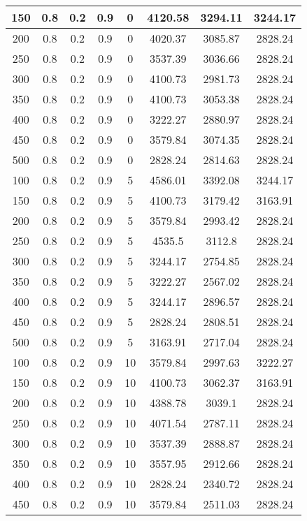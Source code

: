 \documentclass[a4paper, 12pt]{extreport}
\begin{document}
\begin{itemize}
\begin{longtable}{|c|c|c|c|c|c|c|c|}
			150 & 0.8 & 0.2 & 0.9 & 0 & 4120.58 & 3294.11 & 3244.17 \\\hline
			200 & 0.8 & 0.2 & 0.9 & 0 & 4020.37 & 3085.87 & 2828.24 \\\hline
			250 & 0.8 & 0.2 & 0.9 & 0 & 3537.39 & 3036.66 & 2828.24 \\\hline
			300 & 0.8 & 0.2 & 0.9 & 0 & 4100.73 & 2981.73 & 2828.24 \\\hline
			350 & 0.8 & 0.2 & 0.9 & 0 & 4100.73 & 3053.38 & 2828.24 \\\hline
			400 & 0.8 & 0.2 & 0.9 & 0 & 3222.27 & 2880.97 & 2828.24 \\\hline
			450 & 0.8 & 0.2 & 0.9 & 0 & 3579.84 & 3074.35 & 2828.24 \\\hline
			500 & 0.8 & 0.2 & 0.9 & 0 & 2828.24 & 2814.63 & 2828.24 \\\hline
			100 & 0.8 & 0.2 & 0.9 & 5 & 4586.01 & 3392.08 & 3244.17 \\\hline
			150 & 0.8 & 0.2 & 0.9 & 5 & 4100.73 & 3179.42 & 3163.91 \\\hline
			200 & 0.8 & 0.2 & 0.9 & 5 & 3579.84 & 2993.42 & 2828.24 \\\hline
			250 & 0.8 & 0.2 & 0.9 & 5 & 4535.5 & 3112.8 & 2828.24 \\\hline
			300 & 0.8 & 0.2 & 0.9 & 5 & 3244.17 & 2754.85 & 2828.24 \\\hline
			350 & 0.8 & 0.2 & 0.9 & 5 & 3222.27 & 2567.02 & 2828.24 \\\hline
			400 & 0.8 & 0.2 & 0.9 & 5 & 3244.17 & 2896.57 & 2828.24 \\\hline
			450 & 0.8 & 0.2 & 0.9 & 5 & 2828.24 & 2808.51 & 2828.24 \\\hline
			500 & 0.8 & 0.2 & 0.9 & 5 & 3163.91 & 2717.04 & 2828.24 \\\hline
			100 & 0.8 & 0.2 & 0.9 & 10 & 3579.84 & 2997.63 & 3222.27 \\\hline
			150 & 0.8 & 0.2 & 0.9 & 10 & 4100.73 & 3062.37 & 3163.91 \\\hline
			200 & 0.8 & 0.2 & 0.9 & 10 & 4388.78 & 3039.1 & 2828.24 \\\hline
			250 & 0.8 & 0.2 & 0.9 & 10 & 4071.54 & 2787.11 & 2828.24 \\\hline
			300 & 0.8 & 0.2 & 0.9 & 10 & 3537.39 & 2888.87 & 2828.24 \\\hline
			350 & 0.8 & 0.2 & 0.9 & 10 & 3557.95 & 2912.66 & 2828.24 \\\hline
			400 & 0.8 & 0.2 & 0.9 & 10 & 2828.24 & 2340.72 & 2828.24 \\\hline
			450 & 0.8 & 0.2 & 0.9 & 10 & 3579.84 & 2511.03 & 2828.24 \\\hline

\end{longtable}
\end{itemize}
\end{document}

